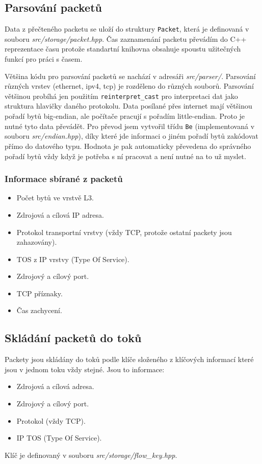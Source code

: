 \documentclass{article}
\begin{document}
\subsection{Parsování packetů}
Data z přečteného packetu se uloží do struktury \verb|Packet|, která je
definovaná v souboru \textit{src/storage/packet.hpp}. Čas zaznamenání packetu
převádím do C++ reprezentace času protože standartní knihovna obsahuje spoustu
užitečných funkcí pro práci s časem.

Většina kódu pro parsování packetů se nachází v adresáři \textit{src/parser/}.
Parsování různých vrstev (ethernet, ipv4, tcp) je rozděleno do různých souborů.
Parsování většinou probíhá jen použitím \verb|reinterpret_cast| pro
interpretaci dat jako struktura hlavičky daného protokolu. Data posílané přes
internet mají většinou pořadí bytů big-endian, ale počítače pracují s pořadím
little-endian. Proto je nutné tyto data převádět. Pro převod jsem vytvořil
třídu \verb|Be| (implementovaná v souboru \textit{src/endian.hpp}), díky které
jde informaci o jiném pořadí bytů zakódovat přímo do datového typu. Hodnota je
pak automaticky převedena do správného pořadí bytů vždy když je potřeba s ní
pracovat a není nutné na to už myslet.

\subsubsection{Informace sbírané z packetů}
\begin{itemize}
    \item Počet bytů ve vrstvě L3.
    \item Zdrojová a cílová IP adresa.
    \item Protokol transportní vrstvy (vždy TCP, protože ostatní packety jsou
          zahazovány).
    \item TOS z IP vrstvy (Type Of Service).
    \item Zdrojový a cílový port.
    \item TCP příznaky.
    \item Čas zachycení.
\end{itemize}

\subsection{Skládání packetů do toků}
Packety jsou skládány do toků podle klíče složeného z klíčových informací které
jsou v jednom toku vždy stejné. Jsou to informace:
\begin{itemize}
    \item Zdrojová a cílová adresa.
    \item Zdrojový a cílový port.
    \item Protokol (vždy TCP).
    \item IP TOS (Type Of Service).
\end{itemize}
Klíč je definovaný v souboru \textit{src/storage/flow\_key.hpp}.
\end{document}
